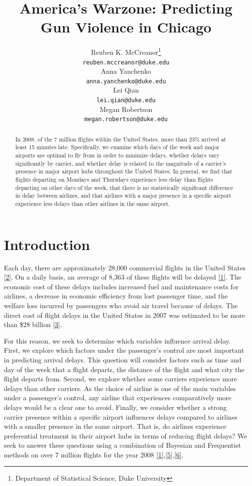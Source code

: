 \documentclass{article} %
\title{America's Warzone: Predicting Gun Violence in Chicago}
\author{
Reuben K. McCreanor\thanks{Department of Statistical Science, Duke University} \\  
\texttt{reuben.mccreanor@duke.edu} \\
\And
Anna Yanchenko\footnotemark[1] \\
\texttt{anna.yanchenko@duke.edu} \\
\And 
Lei Qian\footnotemark[1] \\
\texttt{lei.qian@duke.edu} \\
\And
Megan Robertson\footnotemark[1] \\
\texttt{megan.robertson@duke.edu} \\ 
}
\begin{document}
\maketitle

\begin{abstract}
In 2008, of the 7 million flights within the United States, more than 23\% arrived at least 15 minutes late. Specifically, we examine which days of the week and major airports are optimal to fly from in order to minimize delays, whether delays vary significantly by carrier, and whether delay is related to the magnitude of a carrier's presence in major airport hubs throughout the United States. In general, we find that flights departing on Mondays and Thursdays experience less delay than flights departing on other days of the week, that there is no statistically significant difference in delay between airlines, and that airlines with a major presence in a specific airport experience less delays than other airlines in the same airport.
\end{abstract}

\section{Introduction}
\label{headings}

Each day, there are approximately 28,000 commercial flights in the United States \hyperlink{Ref2}{[2]}. On a daily basis, an average of 8,363 of these flights will be delayed \hyperlink{Ref1}{[1]}. The economic cost of these delays includes increased fuel and maintenance costs for airlines, a decrease in economic efficiency from lost passenger time, and the welfare loss incurred by passengers who avoid air travel because of delays. The direct cost of flight delays in the United States in 2007 was estimated to be more than \$28 billion \hyperlink{Ref3}{[3]}. 

For this reason, we seek to determine which variables influence arrival delay. First, we explore which factors under the passenger's control are most important in predicting arrival delays. This question will consider factors such as time and day of the week that a flight departs, the distance of the flight and what city the flight departs from. Second, we explore whether some carriers experience more delays than other carriers. As the choice of airline is one of the main variables under a passenger's control, any airline that experiences comparatively more delays would be a clear one to avoid. Finally, we consider whether a strong carrier presence within a specific airport influences delays compared to airlines with a smaller presence in the same airport. That is, do airlines experience preferential treatment in their airport hubs in terms of reducing flight delays?   We seek to answer these questions using a combination of Bayesian and Frequentist methods on over 7 million flights for the year 2008 \hyperlink{Ref1}{[1]},\hyperlink{Ref5}{[5]},\hyperlink{Ref6}{[6]}.  
\end{document}
